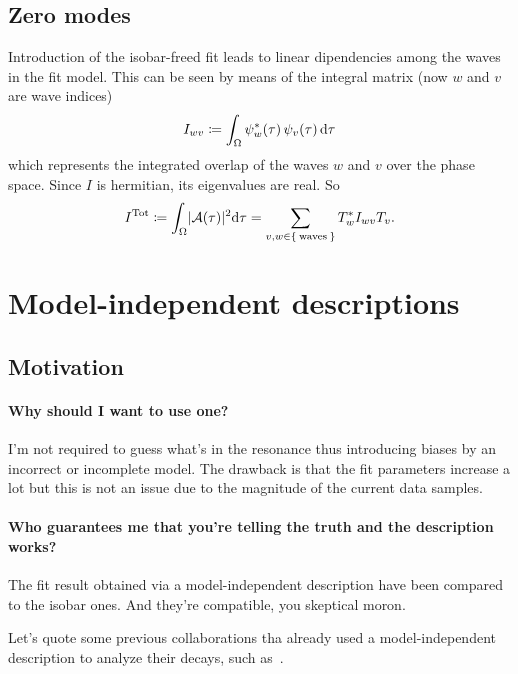 \documentclass[
	fontsize=10pt,
	open=right,
	twoside,
    english,
    draft,
]{scrbook}
\newcommand{\A}{\ensuremath{\mathcal{A}}}
\begin{document}
        \subsection{Zero modes}

    Introduction of the isobar-freed fit leads to linear dipendencies among the waves in the fit model.
    This can be seen by means of the integral matrix (now $w$ and $v$ are wave indices)
    \begin{equation}
        I_{wv} \coloneqq \int_\Omega \psi_w^*(\tau)\,\psi_v(\tau)\mathop{}\!\textup{d}\tau
    \end{equation}
    which represents the integrated overlap of the waves $w$ and $v$ over the phase space.
    Since $I$ is hermitian, its eigenvalues are real.
    So
    \begin{equation}
        I^{\text{Tot}} \coloneqq \int_\Omega \abs{\A(\tau)}^2\!\ud \tau = \sum_{v,w \in \Set{\text{waves}}} T_w^* I_{wv} T_v.
    \end{equation}

    \section{Model-independent descriptions}

    \subsection{Motivation}

    \paragraph{Why should I want to use one?}

    I'm not required to guess what's in the resonance thus introducing biases by an incorrect or incomplete model.
    The drawback is that the fit parameters increase a lot but this is not an issue due to the magnitude of the current data samples.


    \paragraph{Who guarantees me that you're telling the truth and the description works?}

    The fit result obtained via a model-independent description have been compared to the isobar ones.
    And they're compatible, you skeptical moron.


    Let's quote some previous collaborations tha already used a model-independent description to analyze their decays, such as~\cite{PhysRevD.73.032004,Link200914}.
\end{document}

